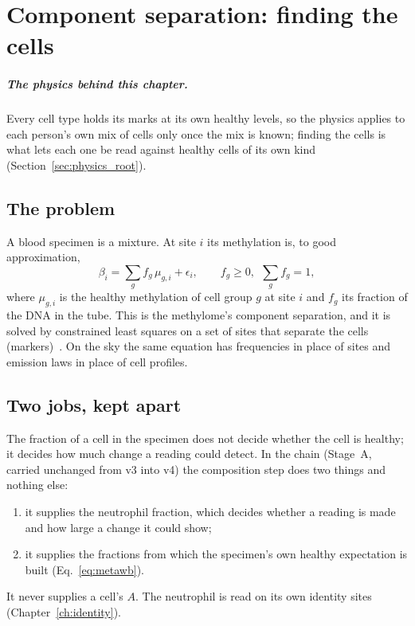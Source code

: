 \chapter{Component separation: finding the cells}\label{ch:separation}

\paragraph{The physics behind this chapter.} Every cell type holds its marks at its own healthy levels, so the physics applies to each person's own mix of cells only once the mix is known; finding the cells is what lets each one be read against healthy cells of its own kind (Section~\ref{sec:physics_root}).

\section{The problem}

A blood specimen is a mixture. At site $i$ its methylation is, to good approximation,
\begin{equation}
  \beta_i=\sum_g f_g\,\mu_{g,i}+\epsilon_i,\qquad f_g\ge0,\ \ \sum_g f_g=1,
  \label{eq:mix}
\end{equation}
where $\mu_{g,i}$ is the healthy methylation of cell group $g$ at site $i$ and $f_g$ its fraction of the DNA in the tube. This is the
methylome's component separation, and it is solved by constrained least squares on a set of sites that separate the cells
(markers)~\cite{Houseman2012,Salas2022}. On the sky the same equation has frequencies in place of sites and emission laws in place
of cell profiles.

\section{Two jobs, kept apart}

The fraction of a cell in the specimen does not decide whether the cell is healthy; it decides how much change a reading could detect. In the chain (Stage~A, carried unchanged from v3 into v4) the composition step does two things and nothing else:
\begin{enumerate}
\item it supplies the neutrophil fraction, which decides whether a reading is made and how large a change it could show;
\item it supplies the fractions from which the specimen's own healthy expectation is built (Eq.~\eqref{eq:metawb}).
\end{enumerate}
It never supplies a cell's $A$. The neutrophil is read on its own identity sites (Chapter~\ref{ch:identity}).

